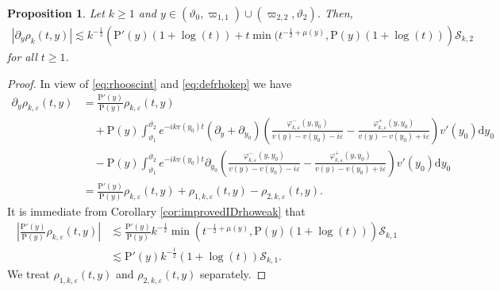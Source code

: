 \documentclass[11pt,reqno]{amsproc}
\newtheorem{proposition}{Proposition}[section]
\theoremstyle{definition}
\numberwithin{equation}{section}
\newcommand{\cS}{{\mathcal S}}
\renewcommand{\d}{\mathrm{d}}
\newcommand{\ep}{\varepsilon}
\begin{document}
\begin{proposition}\label{prop:growthpyrhoweak}
Let $k\geq 1$ and $y\in (\vartheta_0,\varpi_{1,1})\cup (\varpi_{2,2},\vartheta_2)$. Then,
\begin{align*}
|\partial_y\rho_k(t,y)| \lesssim k^{-\frac12}\left( \mathrm{P}'(y)(1+\log(t)) + t\min(t^{-\frac12+\mu(y)}, \mathrm{P}(y)(1+\log(t)) \right)\cS_{k,2}
\end{align*}
for all $t\geq 1$.
\end{proposition}

\begin{proof}
In view of \eqref{eq:rhooscint} and \eqref{eq:defrhokep} we have
\begin{align*}
\partial_y\rho_{k,\ep}(t,y) &= \frac{\mathrm{P'}(y)}{\mathrm{P}(y)}\rho_{k,\ep}(t,y) \\
&\quad + \mathrm{P}(y)\int_{\vartheta_1}^{\vartheta_2} e^{-ikv(y_0)t} \left( \partial_y + \partial_{y_0} \right) \left( \frac{\varphi_{k,\ep}^-(y,y_0)}{v(y) - v(y_0) - i\ep} - \frac{\varphi_{k,\ep}^+(y,y_0)}{v(y) - v(y_0) + i\ep} \right) v'(y_0) \d y_0 \\
&\quad - \mathrm{P}(y)\int_{\vartheta_1}^{\vartheta_2} e^{-ikv(y_0)t}  \partial_{y_0} \left( \frac{\varphi_{k,\ep}^-(y,y_0)}{v(y) - v(y_0) - i\ep} - \frac{\varphi_{k,\ep}^+(y,y_0)}{v(y) - v(y_0) + i\ep} \right) v'(y_0) \d y_0 \\
&= \frac{\mathrm{P'}(y)}{\mathrm{P}(y)}\rho_{k,\ep}(t,y) + \rho_{1,k,\ep}(t,y) - \rho_{2,k,\ep}(t,y).
\end{align*}
It is immediate from Corollary \ref{cor:improvedIDrhoweak} that
\begin{align*}
\left|  \frac{\mathrm{P'}(y)}{\mathrm{P}(y)}\rho_{k,\ep}(t,y) \right| &\lesssim  \frac{\mathrm{P'}(y)}{\mathrm{P}(y)}k^{-\frac12}\min( t^{-\frac12+\mu(y)} , \mathrm{P}(y)(1+\log(t)) )\cS_{k,1} \\
&\lesssim \mathrm{P}'(y)k^{-\frac12}(1+\log(t)) \cS_{k,1}.
\end{align*}
We treat $\rho_{1,k,\ep}(t,y)$ and $\rho_{2,k,\ep}(t,y)$ separately.


\end{proof}
\end{document}
